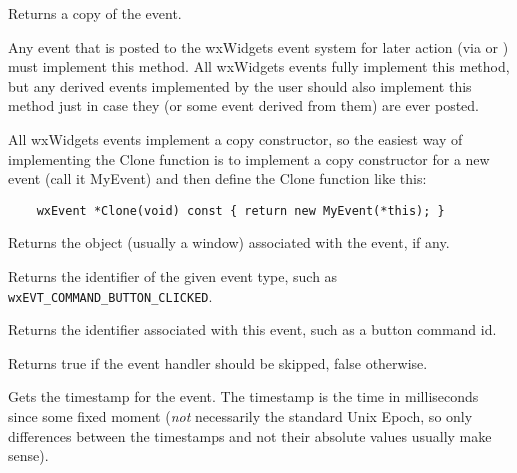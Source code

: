 \label{wxeventclone}


Returns a copy of the event.

Any event that is posted to the wxWidgets event system for later action (via
 or
) must implement this method. All wxWidgets
events fully implement this method, but any derived events implemented by the
user should also implement this method just in case they (or some event
derived from them) are ever posted.

All wxWidgets events implement a copy constructor, so the easiest way of
implementing the Clone function is to implement a copy constructor for
a new event (call it MyEvent) and then define the Clone function like this:

\begin{verbatim}
    wxEvent *Clone(void) const { return new MyEvent(*this); }
\end{verbatim}


\label{wxeventgeteventobject}


Returns the object (usually a window) associated with the
event, if any.


\label{wxeventgeteventtype}


Returns the identifier of the given event type,
such as \texttt{wxEVT\_COMMAND\_BUTTON\_CLICKED}.


\label{wxeventgetid}


Returns the identifier associated with this event, such as a button command id.


\label{wxeventgetskipped}


Returns true if the event handler should be skipped, false otherwise.


\label{wxeventgettimestamp}


Gets the timestamp for the event. The timestamp is the time in milliseconds
since some fixed moment (\emph{not} necessarily the standard Unix Epoch, so
only differences between the timestamps and not their absolute values usually
make sense).


